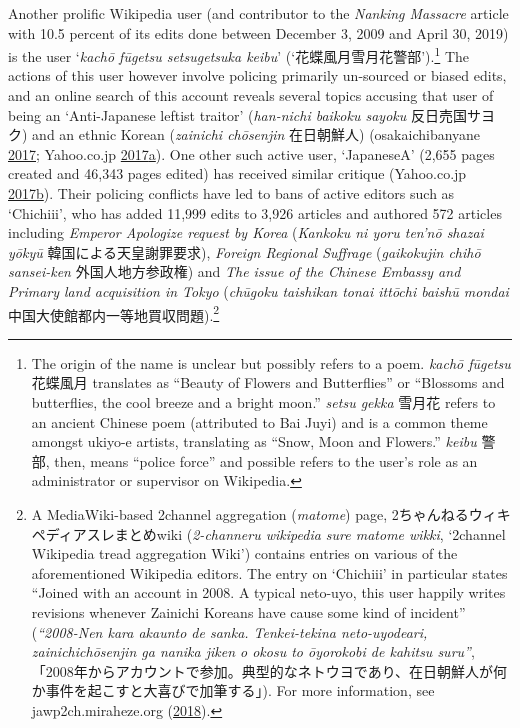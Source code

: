 \documentclass[10pt,british,A4paper,oneside]{memoir}
\begin{document}
Another prolific Wikipedia user (and contributor to the \emph{Nanking
Massacre} article with 10.5 percent of its edits done between December
3, 2009 and April 30, 2019) is the user `\emph{kachō fūgetsu
setsugetsuka keibu}' (`花蝶風月雪月花警部').\footnote{The origin of the
  name is unclear but possibly refers to a poem. \emph{kachō fūgetsu}
  花蝶風月 translates as  ``Beauty of Flowers and Butterflies'' or ``Blossoms and butterflies,
  the cool breeze and a bright moon.'' \emph{setsu gekka} 雪月花 refers
  to an ancient Chinese poem (attributed to Bai Juyi) and is a common
  theme amongst ukiyo-e artists, translating as ``Snow, Moon and
  Flowers.'' \emph{keibu} 警部, then, means ``police force'' and
  possible refers to the user's role as an administrator or supervisor
  on Wikipedia.} The actions of this user however involve policing
primarily un-sourced or biased edits, and an online search of this
account reveals several topics accusing that user of being an
`Anti-Japanese leftist traitor' (\emph{han-nichi baikoku sayoku}
反日売国サヨク) and an ethnic Korean (\emph{zainichi chōsenjin}
在日朝鮮人) (osakaichibanyane
\protect\hyperlink{ref-osakaichibanyane_isnt_2017}{2017}; Yahoo.co.jp
\protect\hyperlink{ref-anonymous_cant_2017}{2017}\protect\hyperlink{ref-anonymous_cant_2017}{a}).
One other such active user, `JapaneseA' (2,655 pages created and 46,343
pages edited) has received similar critique (Yahoo.co.jp
\protect\hyperlink{ref-anonymous_japanesea_2017}{2017}\protect\hyperlink{ref-anonymous_japanesea_2017}{b}).
Their policing conflicts have led to bans of active editors such as
`Chichiii', who has added 11,999 edits to 3,926 articles and authored
572 articles including \emph{Emperor Apologize request by Korea}
(\emph{Kankoku ni yoru ten'nō shazai yōkyū} 韓国による天皇謝罪要求),
\emph{Foreign Regional Suffrage} (\emph{gaikokujin chihō sansei-ken}
外国人地方参政権) and \emph{The issue of the Chinese Embassy and Primary
land acquisition in Tokyo} (\emph{chūgoku taishikan tonai ittōchi baishū
mondai} 中国大使館都内一等地買収問題).\footnote{A MediaWiki-based
  2channel aggregation (\emph{matome}) page,
  2ちゃんねるウィキペディアスレまとめwiki (\emph{2-channeru wikipedia
  sure matome wikki}, `2channel Wikipedia tread aggregation Wiki')
  contains entries on various of the aforementioned Wikipedia editors.
  The entry on `Chichiii' in particular states ``Joined with an account
  in 2008. A typical neto-uyo, this user happily writes revisions
  whenever Zainichi Koreans have cause some kind of incident''
  (\emph{``2008-Nen kara akaunto de sanka. Tenkei-tekina neto-uyodeari,
  zainichichōsenjin ga nanika jiken o okosu to ōyorokobi de kahitsu
  suru''},
  「2008年からアカウントで参加。典型的なネトウヨであり、在日朝鮮人が何か事件を起こすと大喜びで加筆する」).
  For more information, see jawp2ch.miraheze.org
  (\protect\hyperlink{ref-anonymous_chichiii_2018}{2018}).}
\end{document}

